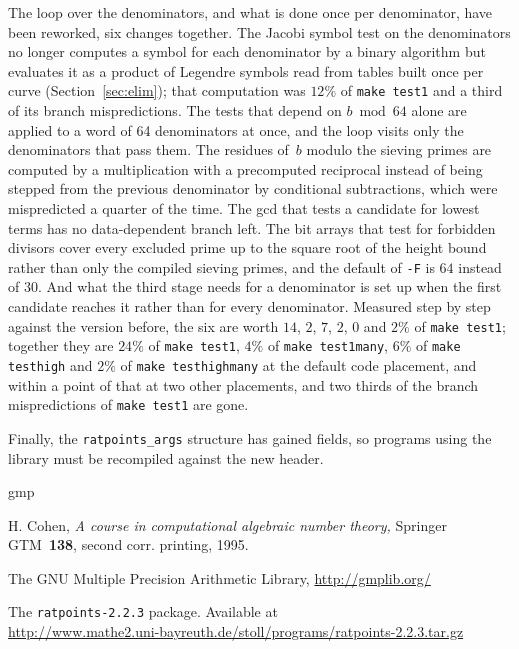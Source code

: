 \documentclass[12pt,a4paper,oneside]{amsart}
\newcommand{\rpversion}{2.2.3} %
\begin{document}
The loop over the denominators, and what is done once per denominator, have
been reworked, six changes together. The Jacobi symbol test on the
denominators no longer computes a symbol for each denominator by a binary
algorithm but evaluates it as a product of Legendre symbols read from tables
built once per curve (Section~\ref{sec:elim}); that computation was $12\%$ of
\texttt{make test1} and a third of its branch mispredictions. The tests that
depend on $b \bmod 64$ alone are applied to a word of 64 denominators at
once, and the loop visits only the denominators that pass them. The residues
of~$b$ modulo the sieving primes are computed by a multiplication with a
precomputed reciprocal instead of being stepped from the previous denominator
by conditional subtractions, which were mispredicted a quarter of the time.
The gcd that tests a candidate for lowest terms has no data-dependent branch
left. The bit arrays that test for forbidden divisors cover every excluded
prime up to the square root of the height bound rather than only the compiled
sieving primes, and the default of \verb+-F+ is $64$ instead of $30$. And what
the third stage needs for a denominator is set up when the first candidate
reaches it rather than for every denominator. Measured step by step against
the version before, the six are worth $14$, $2$, $7$, $2$, $0$ and $2\%$ of
\texttt{make test1}; together they are $24\%$ of \texttt{make test1}, $4\%$
of \texttt{make test1many}, $6\%$ of \texttt{make testhigh} and $2\%$ of
\texttt{make testhighmany} at the default code placement, and within a
point of that at two other placements, and two thirds of the branch
mispredictions of \texttt{make test1} are gone.

Finally, the \texttt{ratpoints\_args} structure has gained fields, so
programs using the library must be recompiled against the new header.


\begin{thebibliography}{gmp}
\frenchspacing

  H. Cohen, \textit{A course in computational algebraic number theory,}
  Springer GTM~\textbf{138}, second corr. printing, 1995.

  The GNU Multiple Precision Arithmetic Library, \url{http://gmplib.org/}

  The \texttt{ratpoints-\rpversion} package. Available at \\
  \url{http://www.mathe2.uni-bayreuth.de/stoll/programs/ratpoints-\rpversion.tar.gz}

\end{thebibliography}
\end{document}
